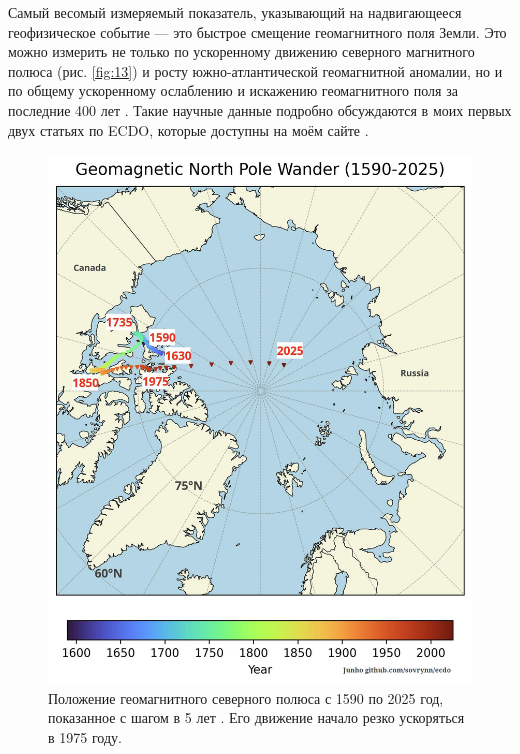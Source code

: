 \documentclass[10pt,twocolumn,letterpaper]{article}
\begin{document}
Самый весомый измеряемый показатель, указывающий на надвигающееся геофизическое событие — это быстрое смещение геомагнитного поля Земли. Это можно измерить не только по ускоренному движению северного магнитного полюса (рис. \ref{fig:13}) и росту южно-атлантической геомагнитной аномалии, но и по общему ускоренному ослаблению и искажению геомагнитного поля за последние 400 лет \cite{3}. Такие научные данные подробно обсуждаются в моих первых двух статьях по ECDO, которые доступны на моём сайте \cite{3}.

\begin{figure}[t]

\begin{center}
   \includegraphics[width=1\linewidth]{npw.jpg}
\end{center}
   \caption{Положение геомагнитного северного полюса с 1590 по 2025 год, показанное с шагом в 5 лет \cite{41}. Его движение начало резко ускоряться в 1975 году.}
\label{fig:13}
\label{fig:onecol}
\end{figure}
\end{document}
